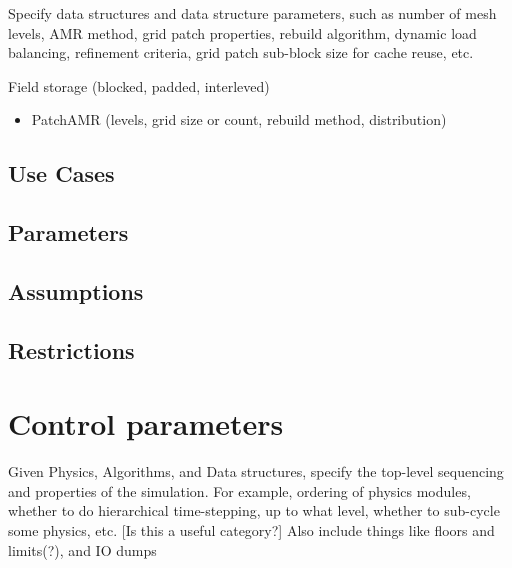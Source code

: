 \documentclass{book}
\begin{document}
Specify data structures and data structure parameters, such as number
of mesh levels, AMR method, grid patch properties, rebuild algorithm,
dynamic load balancing, refinement criteria, grid patch sub-block size
for cache reuse, etc.

Field storage (blocked, padded, interleved)

\begin{itemize}
\item PatchAMR (levels, grid size or count, rebuild method, distribution)
\end{itemize}

\subsection{Use Cases}
\subsection{Parameters}
\subsection{Assumptions}
\subsection{Restrictions}

\section{Control parameters} \label{s:control}

Given Physics, Algorithms, and Data structures, specify the top-level
sequencing and properties of the simulation.  For example, ordering of
physics modules, whether to do hierarchical time-stepping, up to what
level, whether to sub-cycle some physics, etc. [Is this a useful
category?]  Also include things like floors and limits(?), and IO
dumps
\end{document}
